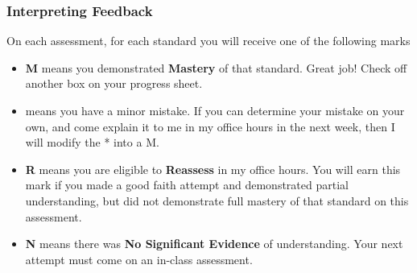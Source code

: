 \documentclass{beamer}
\begin{document}
\begin{frame}\frametitle{Interpreting Feedback}
On each assessment, for each standard you will receive one of the following marks
\begin{itemize}
\item {\bf M} means you demonstrated {\bf Mastery} of that standard.  Great job!  Check off another box on your progress sheet.
\item {\bf *} means you have a minor mistake. If you can determine your mistake on your own, and come explain it to me in my office hours in the next week, then I will modify the * into a M. 
\item {\bf R} means you are eligible to {\bf Reassess} in my office hours.  You will earn this mark if you made a good faith attempt and demonstrated partial understanding, but did not demonstrate full mastery of that standard on this assessment.  
\item {\bf N} means there was {\bf No Significant Evidence} of understanding. Your next attempt must come on an in-class assessment.  
\end{itemize}
\end{frame}
\end{document}
